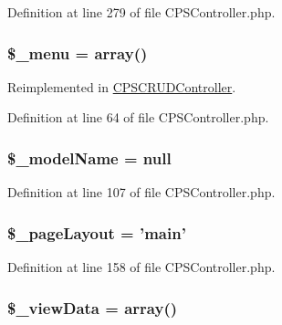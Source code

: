 Definition at line 279 of file CPSController.php.

\hypertarget{classCPSController_a4192f529627c76fa7a70ae23b9582516}{
\subsubsection[{\$\_\-menu}]{\setlength{\rightskip}{0pt plus 5cm}\$\_\-menu = {\bf array}()}}
\label{classCPSController_a4192f529627c76fa7a70ae23b9582516}


Reimplemented in \hyperlink{classCPSCRUDController_a4192f529627c76fa7a70ae23b9582516}{CPSCRUDController}.



Definition at line 64 of file CPSController.php.

\hypertarget{classCPSController_a3caade7aa0b96407057e060e4a8bba1e}{
\subsubsection[{\$\_\-modelName}]{\setlength{\rightskip}{0pt plus 5cm}\$\_\-modelName = null}}
\label{classCPSController_a3caade7aa0b96407057e060e4a8bba1e}


Definition at line 107 of file CPSController.php.

\hypertarget{classCPSController_a112cfb0eb5096b5a3d03c88d0aa1fa50}{
\subsubsection[{\$\_\-pageLayout}]{\setlength{\rightskip}{0pt plus 5cm}\$\_\-pageLayout = 'main'}}
\label{classCPSController_a112cfb0eb5096b5a3d03c88d0aa1fa50}


Definition at line 158 of file CPSController.php.

\hypertarget{classCPSController_a32acaa681d9d516f9964704f41590546}{
\subsubsection[{\$\_\-viewData}]{\setlength{\rightskip}{0pt plus 5cm}\$\_\-viewData = {\bf array}()}}
\label{classCPSController_a32acaa681d9d516f9964704f41590546}


